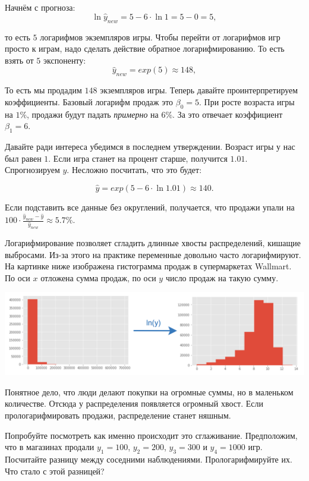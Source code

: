 \documentclass[12pt, a4paper, oneside]{article}
\theoremstyle{plain} %
\theoremstyle{definition}
\newcounter{problem}%
\renewcommand{\theproblem}{\arabic{problem}}
\newenvironment{problem}[1]{
\addtocounter{problem}{1}\noindent{ \color{titleblue} \large \bfseries Упражнение~\theproblem~#1 \vspace{1ex} \newline}
}{ }
\begin{document}
\begin{solution}
Начнём с прогноза: 
$$ 
\ln \hat y_{new} = 5 - 6 \cdot \ln 1 = 5 - 0 = 5,
$$

то есть $5$ логарифмов экземпляров игры. Чтобы перейти от логарифмов игр просто к играм, надо сделать действие обратное логарифмированию. То есть взять от $5$ экспоненту: 
$$
\hat y_{new} = exp(5) \approx 148,
$$

То есть мы продадим $148$ экземпляров игры. Теперь давайте проинтерпретируем коэффициенты. Базовый логарифм продаж это $\beta_0 = 5$.  При росте возраста игры на $1\%$, продажи будут падать \textit{примерно} на $6\%$. За это отвечает коэффициент $\beta_1 = 6$. 

Давайте ради интереса убедимся в последнем утверждении.  Возраст игры у нас был равен $1$. Если игра станет на процент старше, получится $1.01$. Спрогнозируем $y$. Несложно посчитать, что это будет:

$$
\hat y = exp(5 - 6 \cdot \ln 1.01) \approx 140.
$$

Если подставить все данные без округлений, получается, что продажи упали на $100 \cdot \frac{\hat y_{new}-\hat y}{\hat y_{new}} \approx 5.7\%$.
\end{solution}


\begin{problem}{}
Логарифмирование позволяет сгладить длинные хвосты распределений, кишащие выбросами. Из-за этого на практике переменные довольно часто логарифмируют. На картинке ниже изображена гистограмма продаж в супермаркетах Wallmart. По оси $x$ отложена сумма продаж, по оси $y$ число продаж на такую сумму.  

\begin{center}
	\includegraphics[scale=0.2]{y_lny.png}
\end{center}

Понятное дело, что люди делают покупки на огромные суммы, но в маленьком количестве. Отсюда у распределения появляется огромный хвост. Если прологарифмировать продажи, распределение станет няшным.

Попробуйте посмотреть как именно происходит это сглаживание. Предположим, что в магазинах продали $y_1 =100$, $y_2 = 200$, $y_3 = 300$ и $y_4 = 1000$ игр. Посчитайте разницу между соседними наблюдениями. Прологарифмируйте их. Что стало с этой разницей? 
\end{problem}
\end{document}
